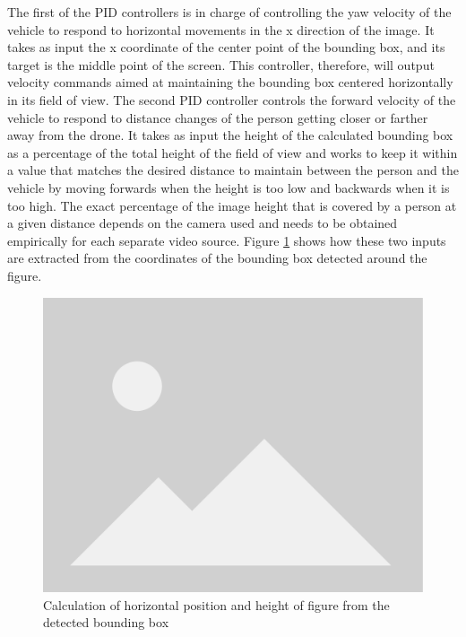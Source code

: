 The first of the PID controllers is in charge of controlling the yaw velocity of the vehicle to respond to horizontal movements in the x direction of the image.
It takes as input the x coordinate of the center point of the bounding box, and its target is the middle point of the screen.
This controller, therefore, will output velocity commands aimed at maintaining the bounding box centered horizontally in its field of view.
The second PID controller controls the forward velocity of the vehicle to respond to distance changes of the person getting closer or farther away from the drone.
It takes as input the height of the calculated bounding box as a percentage of the total height of the field of view and works to keep it within a value that matches the desired distance to maintain between the person and the vehicle by moving forwards when the height is too low and backwards when it is too high.
The exact percentage of the image height that is covered by a person at a given distance depends on the camera used and needs to be obtained empirically for each separate video source.
Figure \ref{fig:follow-input-calcs} shows how these two inputs are extracted from the coordinates of the bounding box detected around the figure.

\begin{figure}
  \centering
  \includegraphics[width=\textwidth, keepaspectratio]{img/placeholder.png}
  \caption{Calculation of horizontal position and height of figure from the detected bounding box}
  \label{fig:follow-input-calcs}
\end{figure}


